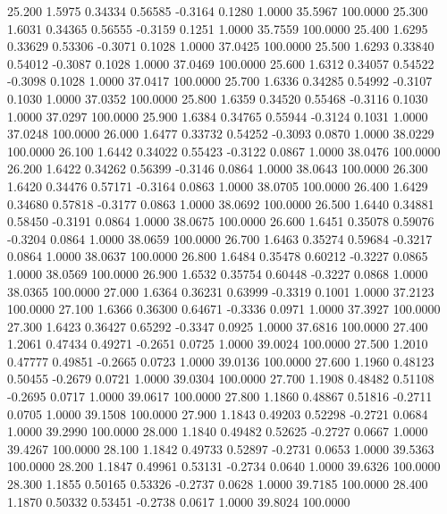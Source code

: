   25.200   1.5975   0.34334   0.56585  -0.3164   0.1280   1.0000  35.5967 100.0000
  25.300   1.6031   0.34365   0.56555  -0.3159   0.1251   1.0000  35.7559 100.0000
  25.400   1.6295   0.33629   0.53306  -0.3071   0.1028   1.0000  37.0425 100.0000
  25.500   1.6293   0.33840   0.54012  -0.3087   0.1028   1.0000  37.0469 100.0000
  25.600   1.6312   0.34057   0.54522  -0.3098   0.1028   1.0000  37.0417 100.0000
  25.700   1.6336   0.34285   0.54992  -0.3107   0.1030   1.0000  37.0352 100.0000
  25.800   1.6359   0.34520   0.55468  -0.3116   0.1030   1.0000  37.0297 100.0000
  25.900   1.6384   0.34765   0.55944  -0.3124   0.1031   1.0000  37.0248 100.0000
  26.000   1.6477   0.33732   0.54252  -0.3093   0.0870   1.0000  38.0229 100.0000
  26.100   1.6442   0.34022   0.55423  -0.3122   0.0867   1.0000  38.0476 100.0000
  26.200   1.6422   0.34262   0.56399  -0.3146   0.0864   1.0000  38.0643 100.0000
  26.300   1.6420   0.34476   0.57171  -0.3164   0.0863   1.0000  38.0705 100.0000
  26.400   1.6429   0.34680   0.57818  -0.3177   0.0863   1.0000  38.0692 100.0000
  26.500   1.6440   0.34881   0.58450  -0.3191   0.0864   1.0000  38.0675 100.0000
  26.600   1.6451   0.35078   0.59076  -0.3204   0.0864   1.0000  38.0659 100.0000
  26.700   1.6463   0.35274   0.59684  -0.3217   0.0864   1.0000  38.0637 100.0000
  26.800   1.6484   0.35478   0.60212  -0.3227   0.0865   1.0000  38.0569 100.0000
  26.900   1.6532   0.35754   0.60448  -0.3227   0.0868   1.0000  38.0365 100.0000
  27.000   1.6364   0.36231   0.63999  -0.3319   0.1001   1.0000  37.2123 100.0000
  27.100   1.6366   0.36300   0.64671  -0.3336   0.0971   1.0000  37.3927 100.0000
  27.300   1.6423   0.36427   0.65292  -0.3347   0.0925   1.0000  37.6816 100.0000
  27.400   1.2061   0.47434   0.49271  -0.2651   0.0725   1.0000  39.0024 100.0000
  27.500   1.2010   0.47777   0.49851  -0.2665   0.0723   1.0000  39.0136 100.0000
  27.600   1.1960   0.48123   0.50455  -0.2679   0.0721   1.0000  39.0304 100.0000
  27.700   1.1908   0.48482   0.51108  -0.2695   0.0717   1.0000  39.0617 100.0000
  27.800   1.1860   0.48867   0.51816  -0.2711   0.0705   1.0000  39.1508 100.0000
  27.900   1.1843   0.49203   0.52298  -0.2721   0.0684   1.0000  39.2990 100.0000
  28.000   1.1840   0.49482   0.52625  -0.2727   0.0667   1.0000  39.4267 100.0000
  28.100   1.1842   0.49733   0.52897  -0.2731   0.0653   1.0000  39.5363 100.0000
  28.200   1.1847   0.49961   0.53131  -0.2734   0.0640   1.0000  39.6326 100.0000
  28.300   1.1855   0.50165   0.53326  -0.2737   0.0628   1.0000  39.7185 100.0000
  28.400   1.1870   0.50332   0.53451  -0.2738   0.0617   1.0000  39.8024 100.0000
